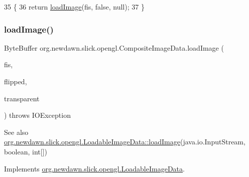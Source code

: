 \begin{DoxyCode}
35                                                                     \{
36         \textcolor{keywordflow}{return} \mbox{\hyperlink{classorg_1_1newdawn_1_1slick_1_1opengl_1_1_composite_image_data_afac01aa86b627c3e172aeb7e66ec2b2f}{loadImage}}(fis, \textcolor{keyword}{false}, null);
37     \}
\end{DoxyCode}
\mbox{\label{classorg_1_1newdawn_1_1slick_1_1opengl_1_1_composite_image_data_a6fa4aa2e8b4b4768415f2a40a7acb8f1}} 
\subsubsection{\texorpdfstring{load\+Image()}{loadImage()}\hspace{0.1cm}{\footnotesize\ttfamily [2/3]}}
{\footnotesize\ttfamily Byte\+Buffer org.\+newdawn.\+slick.\+opengl.\+Composite\+Image\+Data.\+load\+Image (\begin{DoxyParamCaption}\item[{Input\+Stream}]{fis,  }\item[{boolean}]{flipped,  }\item[{int \mbox{[}$\,$\mbox{]}}]{transparent }\end{DoxyParamCaption}) throws I\+O\+Exception\hspace{0.3cm}{\ttfamily [inline]}}

\begin{DoxySeeAlso}{See also}
\mbox{\hyperlink{interfaceorg_1_1newdawn_1_1slick_1_1opengl_1_1_loadable_image_data_a640021b955dde7deeeeabb5ac3738d2b}{org.\+newdawn.\+slick.\+opengl.\+Loadable\+Image\+Data\+::load\+Image}}(java.\+io.\+Input\+Stream, boolean, int\mbox{[}\mbox{]}) 
\end{DoxySeeAlso}


Implements \mbox{\hyperlink{interfaceorg_1_1newdawn_1_1slick_1_1opengl_1_1_loadable_image_data_a448a235d1058316349f513a69f593d9b}{org.\+newdawn.\+slick.\+opengl.\+Loadable\+Image\+Data}}.


